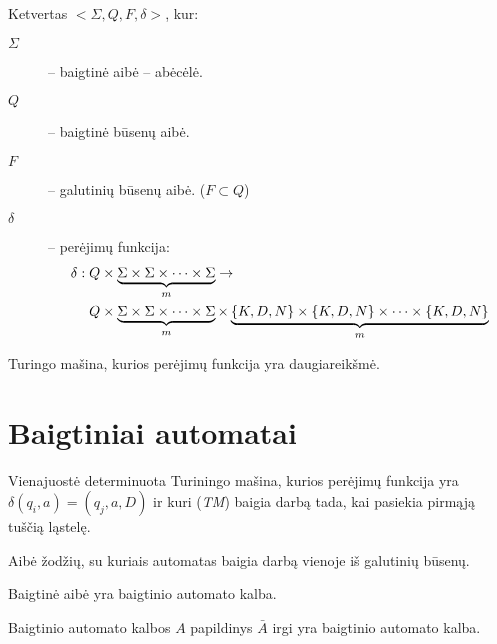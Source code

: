 \begin{defn}
  Ketvertas $<\Sigma,Q,F,\delta>$, kur:
  \begin{description}
    \item[$\Sigma$] – baigtinė aibė – abėcėlė.
    \item[$Q$] – baigtinė būsenų aibė.
    \item[$F$] – galutinių būsenų aibė. ($F \subset Q$)
    \item[$\delta$] – perėjimų funkcija:
      \begin{align*}
        \delta:
        Q &\times \underbrace{\Sigma \times \Sigma \times \cdots
          \times \Sigma}_{m}
        \to\\
        Q &\times \underbrace{%
          \Sigma \times \Sigma \times \cdots \times \Sigma}_{m}%
        \times \underbrace{
          \{K,D,N\} \times \{K,D,N\} \times \cdots \times \{K,D,N\}}_{m}
      \end{align*}
  \end{description}
\end{defn}

\begin{defn}
  Turingo mašina, kurios perėjimų funkcija yra daugiareikšmė.
\end{defn}


\section{Baigtiniai automatai}

\begin{defn}
  Vienajuostė determinuota Turiningo mašina, kurios perėjimų funkcija
  yra $\delta(q_i, a) = (q_j, a, D)$ ir kuri (\emph{TM}) baigia darbą
  tada, kai pasiekia pirmąją tuščią ląstelę.
\end{defn}

\begin{defn}
  Aibė žodžių, su kuriais automatas baigia darbą vienoje iš galutinių 
  būsenų.
\end{defn}

\begin{prop}
  Baigtinė aibė yra baigtinio automato kalba.
\end{prop}

\begin{prop}
  Baigtinio automato kalbos $A$ papildinys $\bar{A}$ irgi yra baigtinio
  automato kalba.
\end{prop}

